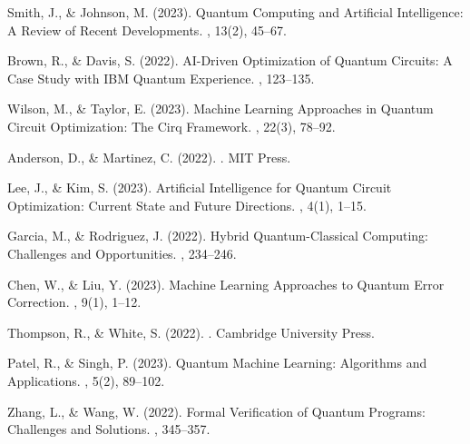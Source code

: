 \documentclass[10pt,twocolumn]{article}
\begin{document}
\begin{thebibliography}{10}
\small

Smith, J., \& Johnson, M. (2023).
\newblock Quantum Computing and Artificial Intelligence: A Review of Recent Developments.
, 13(2), 45--67.

Brown, R., \& Davis, S. (2022).
\newblock AI-Driven Optimization of Quantum Circuits: A Case Study with IBM Quantum Experience.
, 123--135.

Wilson, M., \& Taylor, E. (2023).
\newblock Machine Learning Approaches in Quantum Circuit Optimization: The Cirq Framework.
, 22(3), 78--92.

Anderson, D., \& Martinez, C. (2022).
.
\newblock MIT Press.

Lee, J., \& Kim, S. (2023).
\newblock Artificial Intelligence for Quantum Circuit Optimization: Current State and Future Directions.
, 4(1), 1--15.

Garcia, M., \& Rodriguez, J. (2022).
\newblock Hybrid Quantum-Classical Computing: Challenges and Opportunities.
, 234--246.

Chen, W., \& Liu, Y. (2023).
\newblock Machine Learning Approaches to Quantum Error Correction.
, 9(1), 1--12.

Thompson, R., \& White, S. (2022).
.
\newblock Cambridge University Press.

Patel, R., \& Singh, P. (2023).
\newblock Quantum Machine Learning: Algorithms and Applications.
, 5(2), 89--102.

Zhang, L., \& Wang, W. (2022).
\newblock Formal Verification of Quantum Programs: Challenges and Solutions.
, 345--357.

\end{thebibliography}

\balance
\end{document}
